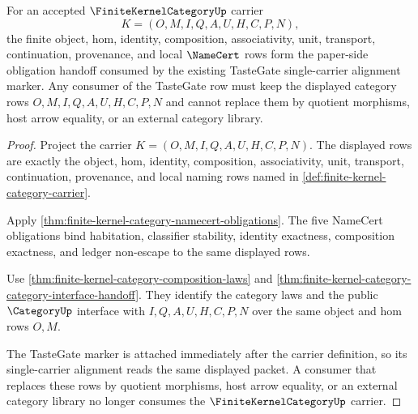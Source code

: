 \begin{theorem}
\label{thm:finite-kernel-category-tastegate-obligation-handoff}
For an accepted $\FiniteKernelCategoryUp$ carrier
$$
K=(O,M,I,Q,A,U,H,C,P,N),
$$
the finite object, hom, identity, composition, associativity, unit, transport, continuation, provenance, and local $\NameCert$ rows form the paper-side obligation handoff consumed by the existing TasteGate single-carrier alignment marker. Any consumer of the TasteGate row must keep the displayed category rows $O,M,I,Q,A,U,H,C,P,N$ and cannot replace them by quotient morphisms, host arrow equality, or an external category library.
\end{theorem}
\begin{proof}
Project the carrier $K=(O,M,I,Q,A,U,H,C,P,N)$. The displayed rows are exactly the object, hom, identity, composition, associativity, unit, transport, continuation, provenance, and local naming rows named in \autoref{def:finite-kernel-category-carrier}.

Apply \autoref{thm:finite-kernel-category-namecert-obligations}. The five NameCert obligations bind habitation, classifier stability, identity exactness, composition exactness, and ledger non-escape to the same displayed rows.

Use \autoref{thm:finite-kernel-category-composition-laws} and \autoref{thm:finite-kernel-category-category-interface-handoff}. They identify the category laws and the public $\CategoryUp$ interface with $I,Q,A,U,H,C,P,N$ over the same object and hom rows $O,M$.

The TasteGate marker is attached immediately after the carrier definition, so its single-carrier alignment reads the same displayed packet. A consumer that replaces these rows by quotient morphisms, host arrow equality, or an external category library no longer consumes the $\FiniteKernelCategoryUp$ carrier.
\end{proof}

